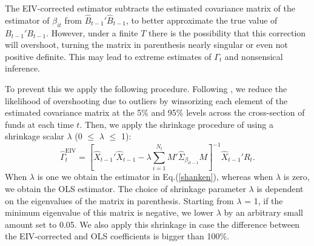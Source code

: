 \par The EIV-corrected estimator subtracts the estimated covariance matrix of the estimator of $\beta_{it}$ from $\hat{B}_{t-1}'\hat{B}_{t-1}$, to better approximate the true value of $B_{t-1}'B_{t-1}$. However, under a finite $T$ there is the possibility that this correction will overshoot, turning the matrix in parenthesis  nearly singular or even not positive definite. This may lead to extreme estimates of $\Gamma_t$ and nonsensical inference. 
\par To prevent this we apply the following procedure. Following \citet{chordia2015cross}, we reduce the likelihood of overshooting due to outliers by winsorizing each element of the estimated covariance matrix at the 5\% and 95\% levels across the cross-section of funds at each time $t$. Then, we apply the shrinkage procedure of \citet{raponi2017testing} using a shrinkage scalar $\lambda$ (0 $\leq$ $\lambda$ $\leq$ 1):
\begin{equation}
    \label{Y_EIV} 
    \hat{\Gamma}^{\text{EIV}}_{t} = \left[\hat{X}_{t-1}'\hat{X}_{t-1} - \lambda\sum^{N_t}_{i=1}M'\hat{\Sigma}_{\beta_{it-1}}M\right]^{-1}\hat{X}_{t-1}'R_{t}.
\end{equation}
When $\lambda$ is one we obtain the estimator in Eq.(\ref{shanken}), whereas when $\lambda$ is zero, we obtain the OLS estimator. The choice of shrinkage parameter $\lambda$ is dependent on the eigenvalues of the matrix in parenthesis. Starting from $\lambda$ = 1, if the minimum eigenvalue of this matrix is negative, we lower $\lambda$ by an arbitrary small amount set to 0.05. We also apply this shrinkage in case the difference between the EIV-corrected and OLS coefficients is bigger than 100\%.        
